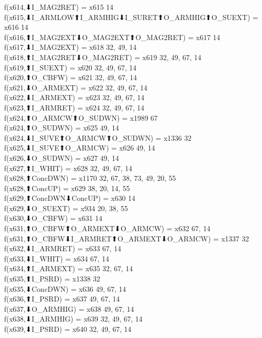 f(x614,⬇I_MAG2RET) = x615 {14} \\
f(x615,⬇I_ARMLOW⬆I_ARMHIG⬇I_SURET⬆O_ARMHIG⬆O_SUEXT) = x616 {14} \\
f(x616,⬆I_MAG2EXT⬇O_MAG2EXT⬆O_MAG2RET) = x617 {14} \\
f(x617,⬇I_MAG2EXT) = x618 {32, 49, 14} \\
f(x618,⬆I_MAG2RET⬇O_MAG2RET) = x619 {32, 49, 67, 14} \\
f(x619,⬆I_SUEXT) = x620 {32, 49, 67, 14} \\
f(x620,⬆O_CBFW) = x621 {32, 49, 67, 14} \\
f(x621,⬇O_ARMEXT) = x622 {32, 49, 67, 14} \\
f(x622,⬇I_ARMEXT) = x623 {32, 49, 67, 14} \\
f(x623,⬆I_ARMRET) = x624 {32, 49, 67, 14} \\
f(x624,⬆O_ARMCW⬆O_SUDWN) = x1989 {67} \\
f(x624,⬆O_SUDWN) = x625 {49, 14} \\
f(x624,⬇I_SUVE⬆O_ARMCW⬆O_SUDWN) = x1336 {32} \\
f(x625,⬇I_SUVE⬆O_ARMCW) = x626 {49, 14} \\
f(x626,⬇O_SUDWN) = x627 {49, 14} \\
f(x627,⬆I_WHIT) = x628 {32, 49, 67, 14} \\
f(x628,⬆ConcDWN) = x1170 {32, 67, 38, 73, 49, 20, 55} \\
f(x628,⬆ConcUP) = x629 {38, 20, 14, 55} \\
f(x629,⬆ConcDWN⬇ConcUP) = x630 {14} \\
f(x629,⬇O_SUEXT) = x934 {20, 38, 55} \\
f(x630,⬇O_CBFW) = x631 {14} \\
f(x631,⬆O_CBFW⬆O_ARMEXT⬇O_ARMCW) = x632 {67, 14} \\
f(x631,⬆O_CBFW⬇I_ARMRET⬆O_ARMEXT⬇O_ARMCW) = x1337 {32} \\
f(x632,⬇I_ARMRET) = x633 {67, 14} \\
f(x633,⬇I_WHIT) = x634 {67, 14} \\
f(x634,⬆I_ARMEXT) = x635 {32, 67, 14} \\
f(x635,⬆I_PSRD) = x1338 {32} \\
f(x635,⬇ConcDWN) = x636 {49, 67, 14} \\
f(x636,⬆I_PSRD) = x637 {49, 67, 14} \\
f(x637,⬇O_ARMHIG) = x638 {49, 67, 14} \\
f(x638,⬇I_ARMHIG) = x639 {32, 49, 67, 14} \\
f(x639,⬇I_PSRD) = x640 {32, 49, 67, 14} \\

